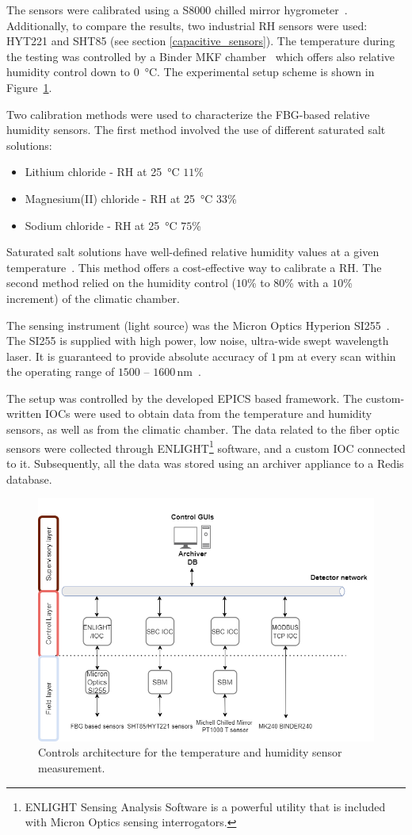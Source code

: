 The sensors were calibrated using a S8000 chilled mirror hygrometer~\cite{michell_s8000}. Additionally, to compare the results, two industrial \gls{RH} sensors were used: HYT221 and SHT85 (see section \ref{capacitive_sensors}). The temperature during the testing was controlled by a Binder MKF chamber~\cite{binder} which offers also relative humidity control down to \SI{0}{\celsius}. The experimental setup scheme is shown in Figure~\ref{fig:fos_arch}. 

Two calibration methods were used to characterize the \gls{FBG}-based relative humidity sensors. The first method involved the use of different saturated salt solutions:
\begin{itemize}
    \item Lithium chloride - \gls{RH} at \SI{25}{\celsius} $11$\%
    \item Magnesium(II) chloride - \gls{RH} at \SI{25}{\celsius} $33$\%
    \item Sodium chloride - \gls{RH} at \SI{25}{\celsius} $75$\%
\end{itemize}
 Saturated salt solutions have well-defined relative humidity values at a given temperature~\cite{Fossa:687857}. This method offers a cost-effective way to calibrate a \gls{RH}. The second method relied on the humidity control ($10$\% to $80$\% with a $10$\% increment) of the climatic chamber.
 
 The sensing instrument (light source) was the Micron Optics Hyperion SI255~\cite{si255}. The SI255 is supplied with high power, low noise, ultra-wide swept wavelength laser. It is guaranteed to provide absolute accuracy of $1$\,pm at every scan within the operating range of $1500$ -- $1600$\,nm~\cite{si255}.

The setup was controlled by the developed \gls{EPICS} based framework. The custom-written \glspl{IOC} were used to obtain data from the temperature and humidity sensors, as well as from the climatic chamber. The data related to the fiber optic sensors were collected through ENLIGHT\footnote{ENLIGHT Sensing Analysis Software is a powerful utility that is included with Micron
Optics sensing interrogators.} software, and a custom \gls{IOC} connected to it. Subsequently, all the data was stored using an archiver appliance to a Redis database. 

\begin{figure}[!h]
\centering
\includegraphics[width=0.75\columnwidth]{Chapter5/images/FOS_dcs_scheme.png}
\caption{Controls architecture for the temperature and humidity sensor measurement.}
\label{fig:fos_arch}
\end{figure}
\newpage
